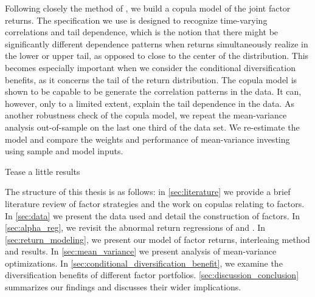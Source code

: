 Following closely the method of \textcite{ChristoffersenLanglois2013}, we build a copula model of the joint factor returns. The specification we use is designed to recognize time-varying correlations and tail dependence, which is the notion that there might be significantly different dependence patterns when returns simultaneously realize in the lower or upper tail, as opposed to close to the center of the distribution. This becomes especially important when we consider the conditional diversification benefits, as it concerns the tail of the return distribution. The copula model is shown to be capable to be generate the correlation patterns in the data. It can, however, only to a limited extent, explain the tail dependence in the data. As another robustness check of the copula model, we repeat the mean-variance analysis out-of-sample on the last one third of the data set. We re-estimate the model and compare the weights and performance of mean-variance investing using sample and model inputs.

Tease a little results
 
The structure of this thesis is as follows: in \autoref{sec:literature} we provide a brief literature review of factor strategies and the work on copulas relating to factors. In \autoref{sec:data} we present the data used and detail the construction of factors. In \autoref{sec:alpha_reg}, we revisit the abnormal return regressions of \textcite{FF2015} and \textcite{Asness2015}. In \autoref{sec:return_modeling}, we present our model of factor returns, interleaing method and results. In \autoref{sec:mean_variance} we present analysis of mean-variance optimizations. In \autoref{sec:conditional_diversification_benefit}, we examine the diversification benefits of different factor portfolios. \autoref{sec:discussion_conclusion} summarizes our findings and discusses their wider implications.